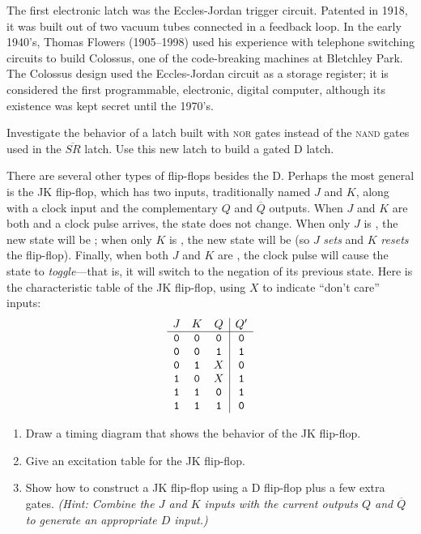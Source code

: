 \begin{tailquote}
The first electronic latch was the Eccles-Jordan trigger circuit. Patented in 1918, it was built out of two vacuum tubes connected in a feedback loop. In the early 1940's, Thomas Flowers (1905--1998) used his experience with telephone switching circuits to build Colossus, one of the code-breaking machines at Bletchley Park. The Colossus design used the Eccles-Jordan circuit as a storage register; it is considered the first programmable, electronic, digital computer, although its existence was kept secret until the 1970's.
\end{tailquote}
\begin{exercises}
\item Investigate the behavior of a latch built with \textsc{nor} gates instead of the \textsc{nand} gates used in the $\overline{SR}$ latch. Use this new latch to build a gated D latch.

\item There are several other types of flip-flops besides the D. Perhaps the most general is the JK flip-flop, which has two inputs, traditionally named $J$ and $K$, along with a clock input and the complementary $Q$ and $\overline{Q}$ outputs. When $J$ and $K$ are both \0 and a clock pulse arrives, the state does not change. When only $J$ is \1, the new state will be \1; when only $K$ is \1, the new state will be \0 (so $J$ \emph{sets} and $K$ \emph{resets} the flip-flop). Finally, when both $J$ and $K$ are \1, the clock pulse will cause the state to \emph{toggle}---that is, it will switch to the negation of its previous state. Here is the characteristic table of the JK flip-flop, using $X$ to indicate ``don't care'' inputs:
\[ \begin{array}{ccc|c}
J & K & Q & Q'\\ \hline
\mathtt{0} & \mathtt{0} & \mathtt{0} & \mathtt{0}\\
\mathtt{0} & \mathtt{0} & \mathtt{1} & \mathtt{1}\\
\mathtt{0} & \mathtt{1} & X & \mathtt{0}\\
\mathtt{1} & \mathtt{0} & X & \mathtt{1}\\
\mathtt{1} & \mathtt{1} & \mathtt{0} & \mathtt{1}\\
\mathtt{1} & \mathtt{1} & \mathtt{1} & \mathtt{0}
\end{array} \]
\begin{enumerate}
\item Draw a timing diagram that shows the behavior of the JK flip-flop.
\item Give an excitation table for the JK flip-flop.
\item Show how to construct a JK flip-flop using a D flip-flop plus a few extra gates. \textit{(Hint: Combine the $J$ and $K$ inputs with the current outputs $Q$ and $\overline{Q}$ to generate an appropriate $D$ input.)}
\end{enumerate}


\end{exercises}
